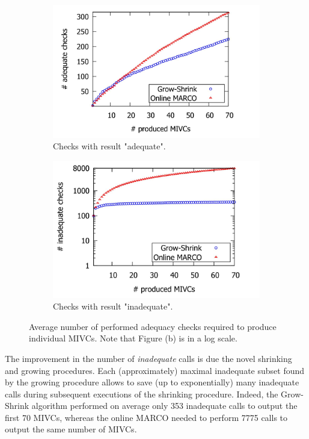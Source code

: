 \begin{figure}
\centering
\begin{subfigure}{\textwidth}
  \centering
  \includegraphics[scale=0.5]{./figs/adequate_checks_per_mivc_70.png}
  \caption{Checks with result "adequate".}
  \label{res:adequate_checks}
\end{subfigure}\hfill
\begin{subfigure}{\textwidth}
  \centering
  \includegraphics[scale=0.5]{./figs/inadequate_checks_per_mivc_70.png}
  \caption{Checks with result "inadequate".}
  \label{res:inadequate_checks}
\end{subfigure}
\caption{Average number of performed adequacy checks required to produce individual MIVCs. Note that Figure (b) is in a log scale.}
\label{res:checks}
\end{figure}

The improvement in the number of \emph{inadequate} calls is due the novel shrinking and growing procedures.
Each (approximately) maximal inadequate subset found by the growing procedure allows to save (up to exponentially) many inadequate calls during subsequent executions of the shrinking procedure.
Indeed, the Grow-Shrink algorithm performed on average only 353 inadequate calls to output the first 70 MIVCs, whereas the online MARCO needed to perform 7775 calls to output the same number of MIVCs.

